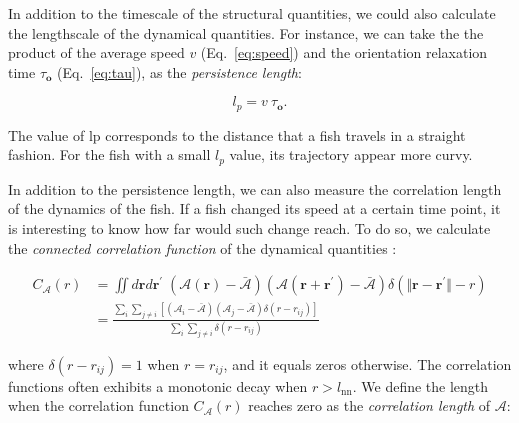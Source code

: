 \documentclass[11pt,twoside]{report}
\begin{document}
In addition to the timescale of the structural quantities, we could also calculate the lengthscale of the dynamical quantities. For instance, we can take the the product of the average speed $v$ (Eq.~\ref{eq:speed}) and the orientation relaxation time $\tau_\mathbf{o}$ (Eq.~\ref{eq:tau}), as the \emph{persistence length}:

\begin{equation}
	l_p = v \ \tau_\mathbf{o}.
\label{eq:lp}
\end{equation}

\noindent The value of \gls{lp} corresponds to the distance that a fish travels in a straight fashion. For the fish with a small $l_p$ value, its trajectory appear more curvy. 

In addition to the persistence length, we can also measure the correlation length of the dynamics of the fish. If a fish changed its speed at a certain time point, it is interesting to know how far would such change reach. To do so, we calculate the \emph{connected correlation function} of the dynamical quantities \cite{newman1999, cavagna2014}:

\begin{equation}
\begin{split}
	C_{\mathcal{A}}(r) 
	&= \iint d\mathbf{r} d\mathbf{r^\prime} \;
	\left(
		\mathcal{A}(\mathbf{r}) - \bar{\mathcal{A}}
	\right)
	\left(
		\mathcal{A}(\mathbf{r} + \mathbf{r^\prime}) - \bar{\mathcal{A}}
	\right)
	\delta(\Vert \mathbf{r} - \mathbf{r^\prime} \Vert - r) \\[2ex]
	&= \frac{\sum_i\sum_{j \neq i}
		\left[
			(\mathcal{A}_i - \bar{\mathcal{A}})
			(\mathcal{A}_j - \bar{\mathcal{A}})
			\delta(r - r_{ij})
		\right]
	}
	{\sum_i\sum_{j \neq i} \delta(r - r_{ij})}
\label{eq:cr}
\end{split}
\end{equation}

\noindent where $\delta(r - r_{ij}) = 1$ when $r = r_{ij}$, and it equals zeros otherwise. The correlation functions often exhibits a monotonic decay when $r > l_\mathrm{nn}$. We define the length when the correlation function $C_\mathcal{A}(r)$ reaches zero as the \emph{correlation length} of $\mathcal{A}$:
\end{document}
